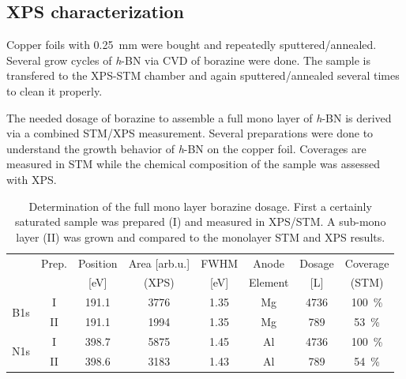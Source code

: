 \subsection{XPS characterization}
Copper foils with \SI{0.25}{\mm} were bought and repeatedly sputtered/annealed. Several grow cycles of \textit{h}-BN via CVD of borazine were done.  The sample is transfered to the XPS-STM chamber and again sputtered/annealed several times to clean it properly.

The needed dosage of borazine to assemble a full mono layer of \textit{h}-BN is derived via a combined STM/XPS measurement. Several preparations were done to understand the growth behavior of \textit{h}-BN on the copper foil. Coverages are measured in STM while the chemical composition of the sample was assessed with XPS.
\begin{table}[h!]
	\centering
	\caption{Determination of the full mono layer borazine dosage. First a certainly saturated sample was prepared (I) and measured in XPS/STM. A sub-mono layer (II) was grown and compared to the monolayer STM and XPS results.}
	\begin{tabular}{cccccccc}
		& Prep. & Position    & Area [arb.u.] & FWHM  & Anode & Dosage  & Coverage\\ 
		&	  &	[eV]	& (XPS)		&[eV]	&Element&[L]	  & (STM) \\ \hline \hline
		\multirow{2}{*}{B1s} 	&I& 191.1 & 3776 & 1.35 & Mg & 4736 & \SI{100}{\percent}\\
		&II& 191.1 & 1994 & 1.35 & Mg & 789 &\SI{53}{\percent}\\ \hline
		\multirow{2}{*}{N1s} 	&I& 398.7 & 5875 & 1.45 & Al  & 4736 & \SI{100}{\percent}\\
		&II& 398.6 & 3183 & 1.43 & Al & 789 &\SI{54}{\percent}\\
	\end{tabular}
\end{table}

